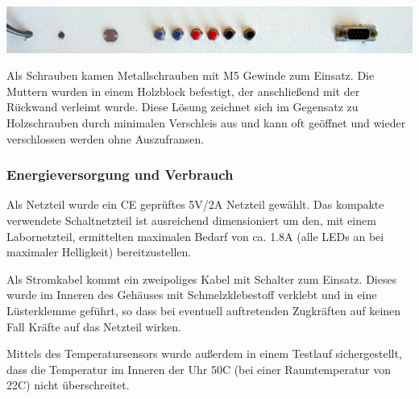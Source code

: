 \vspace{2em}
\centerline{\includegraphics[width=\linewidth]{images/anschluesse.png}}
\label{fig_anschluesse}
\vspace{.5em}

Als Schrauben kamen Metallschrauben mit M5 %
Gewinde zum Einsatz. Die Muttern wurden in einem Holzblock befestigt, der anschließend mit der Rückwand verleimt wurde.%
Diese Lösung zeichnet sich im Gegensatz zu Holzschrauben durch minimalen Verschleis aus und kann oft geöffnet und wieder verschlossen werden ohne Auszufransen.

\subsubsection{Energieversorgung und Verbrauch}
Als Netzteil wurde ein CE geprüftes 5V/2A Netzteil gewählt. Das kompakte verwendete Schaltnetzteil ist ausreichend dimensioniert um den, mit einem Labornetzteil, ermittelten maximalen Bedarf von ca. 1.8A%
(alle LEDs an bei maximaler Helligkeit) bereitzustellen.
 
Als Stromkabel kommt ein zweipoliges Kabel mit Schalter zum Einsatz. Dieses wurde im Inneren des Gehäuses mit Schmelzklebestoff verklebt und in eine Lüsterklemme geführt, so dass bei eventuell auftretenden Zugkräften auf keinen Fall Kräfte auf das Netzteil wirken.

Mittels des Temperatursensors wurde außerdem in einem Testlauf sichergestellt, dass die Temperatur im Inneren der Uhr 50\degree C (bei einer Raumtemperatur von 22\degree C) nicht überschreitet.
